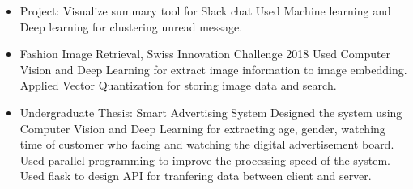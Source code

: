 \documentclass[10pt,a4paper,normalphoto]{altacv}
\begin{document}
\divider


\begin{itemize}
\item
Project: Visualize summary tool for Slack chat
\newline
Used Machine learning and Deep learning for clustering unread message.
\end{itemize}

{}
\smallskip

\begin{itemize}
\item Fashion Image Retrieval, Swiss Innovation Challenge 2018
\newline
Used Computer Vision and Deep Learning for extract image information to image embedding.
\newline
Applied Vector Quantization for storing image data and search.

\smallskip
\item Undergraduate Thesis: Smart Advertising System 
\newline
Designed the system using Computer Vision and Deep Learning for extracting age, gender, watching time of customer who facing and watching the digital advertisement board.
\newline 
Used parallel programming to improve the processing speed of the system.
\newline
Used flask to design API for tranfering data between client and server.
\end{itemize}








\end{document}
